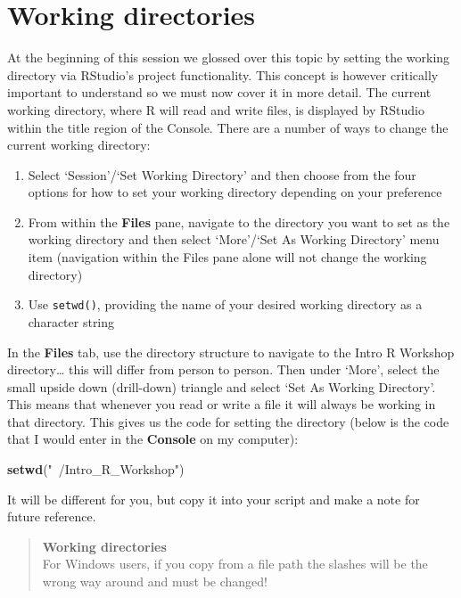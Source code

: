 \documentclass[]{book}
\newenvironment{Shaded}{\begin{snugshade}}{\end{snugshade}}
\newcommand{\KeywordTok}[1]{\textcolor[rgb]{0.13,0.29,0.53}{\textbf{#1}}}
\newcommand{\StringTok}[1]{\textcolor[rgb]{0.31,0.60,0.02}{#1}}
\newcommand{\NormalTok}[1]{#1}
\theoremstyle{definition}
\theoremstyle{definition}
\theoremstyle{definition}
\theoremstyle{remark}
\begin{document}
\section{Working directories}\label{working-directories}

At the beginning of this session we glossed over this topic by setting
the working directory via RStudio's project functionality. This concept
is however critically important to understand so we must now cover it in
more detail. The current working directory, where R will read and write
files, is displayed by RStudio within the title region of the Console.
There are a number of ways to change the current working directory:

\begin{enumerate}
\def\labelenumi{\arabic{enumi}.}
\item
  Select `Session'/`Set Working Directory' and then choose from the four
  options for how to set your working directory depending on your
  preference
\item
  From within the \textbf{Files} pane, navigate to the directory you
  want to set as the working directory and then select `More'/`Set As
  Working Directory' menu item (navigation within the Files pane alone
  will not change the working directory)
\item
  Use \texttt{setwd()}, providing the name of your desired working
  directory as a character string
\end{enumerate}

In the \textbf{Files} tab, use the directory structure to navigate to
the Intro R Workshop directory\ldots{} this will differ from person to
person. Then under `More', select the small upside down (drill-down)
triangle and select `Set As Working Directory'. This means that whenever
you read or write a file it will always be working in that directory.
This gives us the code for setting the directory (below is the code that
I would enter in the \textbf{Console} on my computer):

\begin{Shaded}
\begin{Highlighting}[]
\KeywordTok{setwd}\NormalTok{(}\StringTok{"~/Intro_R_Workshop"}\NormalTok{)}
\end{Highlighting}
\end{Shaded}

It will be different for you, but copy it into your script and make a
note for future reference.

\begin{quote}
\textbf{Working directories}\\
For Windows users, if you copy from a file path the slashes will be the
wrong way around and must be changed!
\end{quote}
\end{document}
